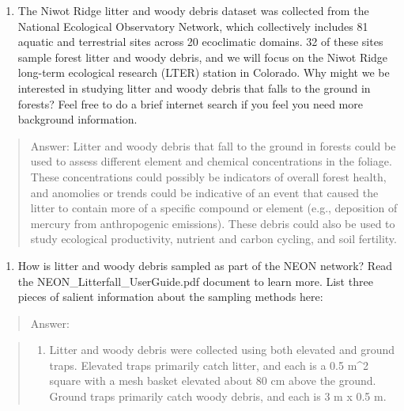 \documentclass[]{article}
\providecommand{\tightlist}{%
  \setlength{\itemsep}{0pt}\setlength{\parskip}{0pt}}
\begin{document}
\begin{enumerate}
\def\labelenumi{\arabic{enumi}.}
\setcounter{enumi}{2}
\tightlist
\item
  The Niwot Ridge litter and woody debris dataset was collected from the
  National Ecological Observatory Network, which collectively includes
  81 aquatic and terrestrial sites across 20 ecoclimatic domains. 32 of
  these sites sample forest litter and woody debris, and we will focus
  on the Niwot Ridge long-term ecological research (LTER) station in
  Colorado. Why might we be interested in studying litter and woody
  debris that falls to the ground in forests? Feel free to do a brief
  internet search if you feel you need more background information.
\end{enumerate}

\begin{quote}
Answer: Litter and woody debris that fall to the ground in forests could
be used to assess different element and chemical concentrations in the
foliage. These concentrations could possibly be indicators of overall
forest health, and anomolies or trends could be indicative of an event
that caused the litter to contain more of a specific compound or element
(e.g., deposition of mercury from anthropogenic emissions). These debris
could also be used to study ecological productivity, nutrient and carbon
cycling, and soil fertility.
\end{quote}

\begin{enumerate}
\def\labelenumi{\arabic{enumi}.}
\setcounter{enumi}{3}
\tightlist
\item
  How is litter and woody debris sampled as part of the NEON network?
  Read the NEON\_Litterfall\_UserGuide.pdf document to learn more. List
  three pieces of salient information about the sampling methods here:
\end{enumerate}

\begin{quote}
Answer:
\end{quote}

\begin{quote}
\begin{enumerate}
\def\labelenumi{\arabic{enumi}.}
\tightlist
\item
  Litter and woody debris were collected using both elevated and ground
  traps. Elevated traps primarily catch litter, and each is a 0.5 m\^{}2
  square with a mesh basket elevated about 80 cm above the ground.
  Ground traps primarily catch woody debris, and each is 3 m x 0.5 m.
\end{enumerate}
\end{quote}
\end{document}
